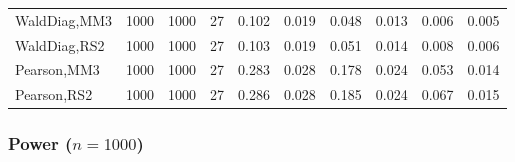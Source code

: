 \documentclass[
]{article}
\begin{document}
\begin{table}[H]
{\begin{tabular}[t]{lrrrrrrlrr}
\hspace{1em}WaldDiag,MM3 & 1000 & 1000 & 27 & 0.102 & 0.019 & 0.048 & 0.013 & 0.006 & 0.005\\
\hspace{1em}WaldDiag,RS2 & 1000 & 1000 & 27 & 0.103 & 0.019 & 0.051 & 0.014 & 0.008 & 0.006\\
\hspace{1em}Pearson,MM3 & 1000 & 1000 & 27 & 0.283 & 0.028 & 0.178 & 0.024 & 0.053 & 0.014\\
\hspace{1em}Pearson,RS2 & 1000 & 1000 & 27 & 0.286 & 0.028 & 0.185 & 0.024 & 0.067 & 0.015\\
\bottomrule
\end{tabular}}
\endgroup{}
\end{table}

\hypertarget{power-n1000-3}{%
\subsubsection{\texorpdfstring{Power
(\(n=1000\))}{Power (n=1000)}}\label{power-n1000-3}}
\end{document}
